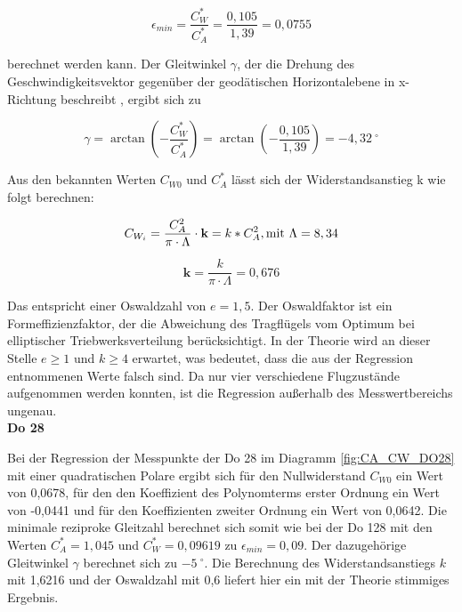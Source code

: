 \begin{equation}
\epsilon_{min}=\frac{C_{W}^{\ast}}{C_{A}^{\ast}}=\frac{0,105}{1,39}=0,0755
\end{equation}

berechnet werden kann. Der Gleitwinkel $\gamma$, der die Drehung des Geschwindigkeitsvektor gegenüber der geodätischen Horizontalebene in x-Richtung beschreibt \cite{Skript}, ergibt sich zu

\begin{equation}
\gamma=\arctan \left(-\frac{C^{*}_W}{C^{*}_A} \right)= \arctan \left(-\frac{0,105}{1,39} \right)= -4,32 \ ^{\circ}  
\end{equation}

Aus den bekannten Werten $C_{W0}$ und $C^{*}_A$ lässt sich der Widerstandsanstieg k wie folgt berechnen: 

\begin{equation}
C_{W_{i}}=\frac{C_A^2}{\pi \cdot \Lambda}\cdot \textbf{k}=k*C_A^2, \\ \mathrm{mit} \ \Lambda=8,34 
\end{equation}

\begin{equation}
\textbf{k}= \frac{k}{\pi \cdot \Lambda}=0,676
\end{equation}


Das entspricht einer Oswaldzahl von $e=1,5$. Der Oswaldfaktor ist ein Formeffizienzfaktor, der die Abweichung des Tragflügels vom Optimum bei elliptischer Triebwerksverteilung berücksichtigt. In der Theorie wird an dieser Stelle $e\geq 1$ und $k\geq 4$ erwartet, was bedeutet, dass die aus der Regression entnommenen Werte falsch sind. Da nur vier verschiedene Flugzustände aufgenommen werden konnten, ist die Regression außerhalb des Messwertbereichs ungenau. \\

\textbf{Do 28}

Bei der Regression der Messpunkte der Do 28 im Diagramm \ref{fig:CA_CW_DO28} mit einer quadratischen Polare ergibt sich für den Nullwiderstand $C_{W0}$ ein Wert von 0,0678, für den den Koeffizient des Polynomterms erster Ordnung ein Wert von -0,0441 und für den Koeffizienten zweiter Ordnung ein Wert von 0,0642. Die minimale reziproke Gleitzahl berechnet sich somit wie bei der Do 128 mit den Werten 
$C^{*}_A=1,045$ und $C^{*}_W=0,09619$ zu $\epsilon_{min}=0,09$. 
Der dazugehörige Gleitwinkel $\gamma$ berechnet sich zu $-5 \ ^{\circ}$. Die Berechnung des Widerstandsanstiegs $k$ mit 1,6216 und der Oswaldzahl mit 0,6 liefert hier ein mit der Theorie stimmiges Ergebnis. 

